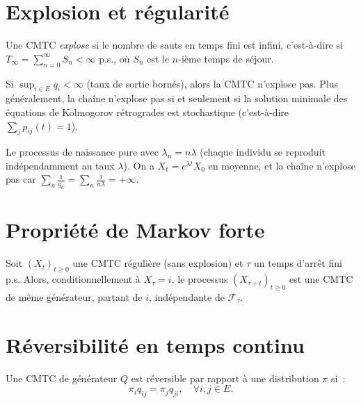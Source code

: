 \section{Explosion et r\'egularit\'e}

\begin{definition}[Explosion]
Une CMTC \emph{explose} si le nombre de sauts en temps fini est infini, c'est-\`a-dire
si $T_{\infty} = \sum_{n=0}^{\infty} S_n < \infty$ p.s., o\`u $S_n$ est le $n$-i\`eme
temps de s\'ejour.
\end{definition}

\begin{theoreme}
\label{thm:non_explosion}
Si $\sup_{i \in E} q_i < \infty$ (taux de sortie born\'es), alors la CMTC
n'explose pas. Plus g\'en\'eralement, la cha\^ine n'explose pas si et seulement si
la solution minimale des \'equations de Kolmogorov r\'etrogrades est stochastique
(c'est-\`a-dire $\sum_j p_{ij}(t) = 1$).
\end{theoreme}

\begin{exemple}
Le processus de naissance pure avec $\lambda_n = n\lambda$ (chaque individu se
reproduit ind\'ependamment au taux $\lambda$). On a $X_t = e^{\lambda t} X_0$
en moyenne, et la cha\^ine n'explose pas car
$\sum_n \frac{1}{q_n} = \sum_n \frac{1}{n\lambda} = +\infty$.
\end{exemple}

\section{Propri\'et\'e de Markov forte}

\begin{theoreme}
\label{thm:markov_forte_continu}
Soit $(X_t)_{t \geq 0}$ une CMTC r\'eguli\`ere (sans explosion) et $\tau$ un
temps d'arr\^et fini p.s. Alors, conditionnellement \`a $X_{\tau} = i$, le processus
$(X_{\tau + t})_{t \geq 0}$ est une CMTC de m\^eme g\'en\'erateur, partant de $i$,
ind\'ependante de $\mathcal{F}_{\tau}$.
\end{theoreme}

\section{R\'eversibilit\'e en temps continu}

\begin{definition}[R\'eversibilit\'e]
Une CMTC de g\'en\'erateur $Q$ est r\'eversible par rapport \`a une distribution $\pi$
si~:
\[
  \pi_i q_{ij} = \pi_j q_{ji}, \quad \forall i, j \in E.
\]
\end{definition}

